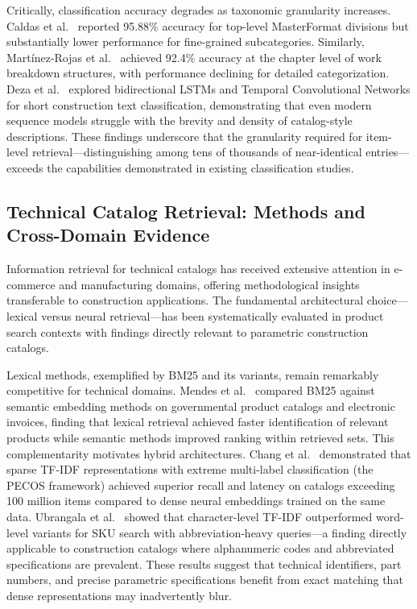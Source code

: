 \documentclass[preprint,review,12pt]{elsarticle}
\begin{document}
Critically, classification accuracy degrades as taxonomic granularity increases. Caldas et al.~\cite{caldasAutomatingHierarchicalDocument2003} reported 95.88\% accuracy for top-level MasterFormat divisions but substantially lower performance for fine-grained subcategories. Similarly, Martínez-Rojas et al.~\cite{martinez-rojasApproachAutomaticClassification2015} achieved 92.4\% accuracy at the chapter level of work breakdown structures, with performance declining for detailed categorization. Deza et al.~\cite{dezaMachineLearningApproach2022} explored bidirectional LSTMs and Temporal Convolutional Networks for short construction text classification, demonstrating that even modern sequence models struggle with the brevity and density of catalog-style descriptions. These findings underscore that the granularity required for item-level retrieval—distinguishing among tens of thousands of near-identical entries—exceeds the capabilities demonstrated in existing classification studies.

\subsection{Technical Catalog Retrieval: Methods and Cross-Domain Evidence}

Information retrieval for technical catalogs has received extensive attention in e-commerce and manufacturing domains, offering methodological insights transferable to construction applications. The fundamental architectural choice—lexical versus neural retrieval—has been systematically evaluated in product search contexts with findings directly relevant to parametric construction catalogs.

Lexical methods, exemplified by BM25 and its variants, remain remarkably competitive for technical domains. Mendes et al.~\cite{mendesComparativeStudyLexical2025} compared BM25 against semantic embedding methods on governmental product catalogs and electronic invoices, finding that lexical retrieval achieved faster identification of relevant products while semantic methods improved ranking within retrieved sets. This complementarity motivates hybrid architectures. Chang et al.~\cite{changExtremeMultilabelLearning2021} demonstrated that sparse TF-IDF representations with extreme multi-label classification (the PECOS framework) achieved superior recall and latency on catalogs exceeding 100 million items compared to dense neural embeddings trained on the same data. Ubrangala et al.~\cite{ubrangalaSearchingFastSlow2024} showed that character-level TF-IDF outperformed word-level variants for SKU search with abbreviation-heavy queries—a finding directly applicable to construction catalogs where alphanumeric codes and abbreviated specifications are prevalent. These results suggest that technical identifiers, part numbers, and precise parametric specifications benefit from exact matching that dense representations may inadvertently blur.
\end{document}
